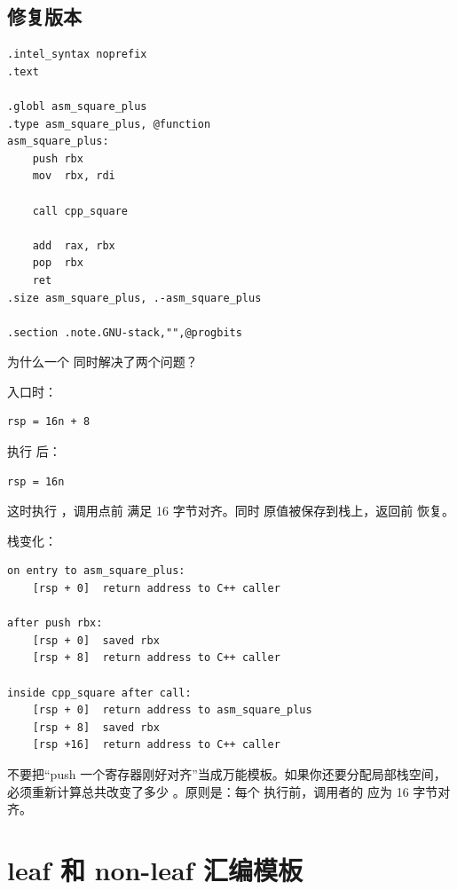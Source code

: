 \subsection{修复版本}

\begin{lstlisting}
.intel_syntax noprefix
.text

.globl asm_square_plus
.type asm_square_plus, @function
asm_square_plus:
    push rbx
    mov  rbx, rdi

    call cpp_square

    add  rax, rbx
    pop  rbx
    ret
.size asm_square_plus, .-asm_square_plus

.section .note.GNU-stack,"",@progbits
\end{lstlisting}

为什么一个   同时解决了两个问题？

入口时：

\begin{lstlisting}
rsp = 16n + 8
\end{lstlisting}

执行   后：

\begin{lstlisting}
rsp = 16n
\end{lstlisting}

这时执行  ，调用点前  满足 16 字节对齐。同时  原值被保存到栈上，返回前   恢复。

栈变化：

\begin{lstlisting}
on entry to asm_square_plus:
    [rsp + 0]  return address to C++ caller

after push rbx:
    [rsp + 0]  saved rbx
    [rsp + 8]  return address to C++ caller

inside cpp_square after call:
    [rsp + 0]  return address to asm_square_plus
    [rsp + 8]  saved rbx
    [rsp +16]  return address to C++ caller
\end{lstlisting}

\begin{warningbox}
不要把“push 一个寄存器刚好对齐”当成万能模板。如果你还要分配局部栈空间，必须重新计算总共改变了多少 。原则是：每个  执行前，调用者的  应为 16 字节对齐。
\end{warningbox}

\section{leaf 和 non-leaf 汇编模板}

